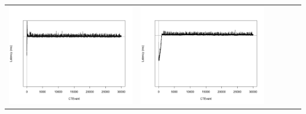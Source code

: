 \begin{table}[htbp]
{\begin{tabular}{l | ccccc}
\begin{minipage}{.15\textwidth}
				\vspace{2pt}
     			 	\includegraphics[width=\linewidth]{images/lat-log-graph/N12}
    				 \end{minipage}
    			   &	 \begin{minipage}{.15\textwidth}
     			 	
				\vspace{2pt}
     			 	\includegraphics[width=\linewidth]{images/lat-log-graph/N14}
    				 \end{minipage}
    			   &	 \begin{minipage}{.15\textwidth}
     			 	

\end{minipage}
\end{tabular}}
\end{table}
